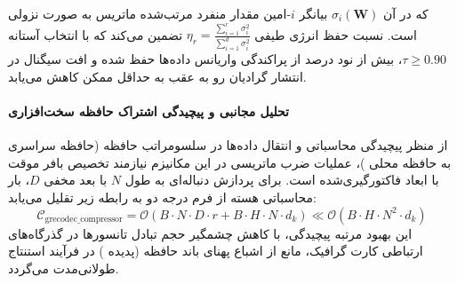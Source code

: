 که در آن $\sigma_i(\mathbf{W})$ بیانگر $i$-امین مقدار منفرد مرتب‌شده ماتریس به صورت نزولی است. نسبت حفظ انرژی طیفی $\eta_r = \frac{\sum_{i=1}^r \sigma_i^2}{\sum_{i=1}^{d} \sigma_i^2}$ تضمین می‌کند که با انتخاب آستانه $\tau \ge 0.90$، بیش از نود درصد از پراکندگی واریانس داده‌ها حفظ شده و افت سیگنال در انتشار گرادیان رو به عقب به حداقل ممکن کاهش می‌یابد.

\paragraph{تحلیل مجانبی و پیچیدگی اشتراک حافظه سخت‌افزاری}
از منظر پیچیدگی محاسباتی و انتقال داده‌ها در سلسومراتب حافظه (حافظه سراسری  به حافظه محلی )، عملیات ضرب ماتریسی در این مکانیزم نیازمند تخصیص بافر موقت با ابعاد فاکتورگیری‌شده است. برای پردازش دنباله‌ای به طول $N$ با بعد مخفی $D$، بار محاسباتی هسته از فرم درجه دو به رابطه زیر تقلیل می‌یابد:
\begin{equation}
\label{eq:complexity_grecodec_compressor}
\mathcal{C}_{\text{grecodec\_compressor}} = \mathcal{O}\left( B \cdot N \cdot D \cdot r + B \cdot H \cdot N \cdot d_k \right) \ll \mathcal{O}\left( B \cdot H \cdot N^2 \cdot d_k \right)
\end{equation}
این بهبود مرتبه پیچیدگی، با کاهش چشمگیر حجم تبادل تانسورها در گذرگاه‌های ارتباطی کارت گرافیک، مانع از اشباع پهنای باند حافظه (پدیده ) در فرآیند استنتاج طولانی‌مدت می‌گردد.
